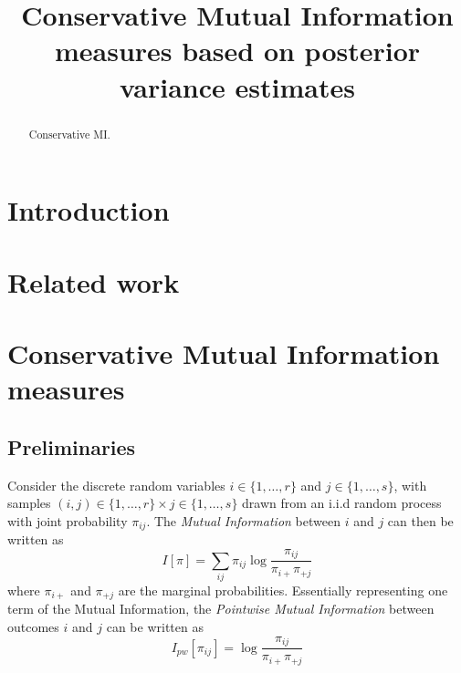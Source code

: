 \documentclass[conference]{IEEEtran}
\begin{document}
\title{Conservative Mutual Information measures based on posterior variance estimates}
\author{
  }
\maketitle
\begin{abstract}
  \boldmath Conservative MI.
\end{abstract}


\section{Introduction}

\section{Related work}

\section{Conservative Mutual Information measures}

\subsection{Preliminaries}

Consider the discrete random variables $i \in \{1,\ldots,r\}$ and $j \in \{1,\ldots,s\}$, with samples $(i,j) \in \{1,\ldots,r\} \times j \in \{1,\ldots,s\}$ drawn from an i.i.d random process with joint probability $\pi_{ij}$. The \emph{Mutual Information} \cite{Cover-1991} between $i$ and $j$ can then be written as
\begin{equation}
\label{eq:mi}
I[\pi] = \sum_{ij} \pi_{ij} \log \frac{\pi_{ij}}{\pi_{i+}\pi_{+j}}
\end{equation}
where $\pi_{i+}$ and $\pi_{+j}$ are the marginal probabilities. Essentially representing one term of the Mutual Information, the \emph{Pointwise Mutual Information} \cite{Church-1990} between outcomes $i$ and $j$ can be written as
\begin{equation}
\label{eq:pwmi}
I_{pw}[\pi_{ij}] = \log \frac{\pi_{ij}}{\pi_{i+}\pi_{+j}}
\end{equation}
\end{document}
